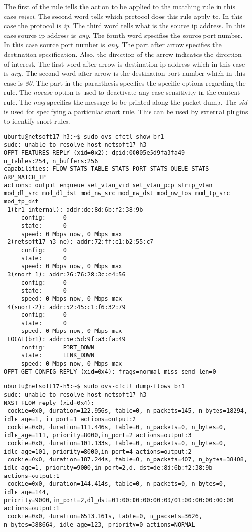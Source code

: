 \documentclass[12pt]{article}
\begin{document}
The first of the rule tells the action to be applied to the matching rule in 
this case \textit{reject}. The second word tells which protocol does this 
rule apply to. In this case the protocol is \textit{ip}. The third word 
tells what is the source ip address. In this case source ip address 
is \textit{any}. The fourth word specifies the source port number. 
In this case source port number is \textit{any}. The part after arrow specifies 
the destination specification. Also, the direction of the arrow indicates the 
direction of interest. The first word after arrow is destination ip address 
which in this case is \textit{any}. The second word
after arrow is the destination port number which in this case is \textit{80}.
The part in the paranthesis specifies the specific options regarding the rule. 
The \textit{nocase} option is used to deactivate any case sensitivity in the 
content rule. The \textit{msg} specifies the message to be printed along the 
packet dump. The \textit{sid} is used for specifying a particular snort rule.
This can be used by external plugins to identify snort rules.


\begin{verbatim}
ubuntu@netsoft17-h3:~$ sudo ovs-ofctl show br1
sudo: unable to resolve host netsoft17-h3
OFPT_FEATURES_REPLY (xid=0x2): dpid:00005e5d9fa3fa49
n_tables:254, n_buffers:256
capabilities: FLOW_STATS TABLE_STATS PORT_STATS QUEUE_STATS ARP_MATCH_IP
actions: output enqueue set_vlan_vid set_vlan_pcp strip_vlan mod_dl_src mod_dl_dst mod_nw_src mod_nw_dst mod_nw_tos mod_tp_src mod_tp_dst
 1(br1-internal): addr:de:8d:6b:f2:38:9b
     config:     0
     state:      0
     speed: 0 Mbps now, 0 Mbps max
 2(netsoft17-h3-ne): addr:72:ff:e1:b2:55:c7
     config:     0
     state:      0
     speed: 0 Mbps now, 0 Mbps max
 3(snort-1): addr:26:76:28:3c:e4:56
     config:     0
     state:      0
     speed: 0 Mbps now, 0 Mbps max
 4(snort-2): addr:52:45:c1:f6:32:79
     config:     0
     state:      0
     speed: 0 Mbps now, 0 Mbps max
 LOCAL(br1): addr:5e:5d:9f:a3:fa:49
     config:     PORT_DOWN
     state:      LINK_DOWN
     speed: 0 Mbps now, 0 Mbps max
OFPT_GET_CONFIG_REPLY (xid=0x4): frags=normal miss_send_len=0

\end{verbatim}

\begin{verbatim}
ubuntu@netsoft17-h3:~$ sudo ovs-ofctl dump-flows br1
sudo: unable to resolve host netsoft17-h3
NXST_FLOW reply (xid=0x4):
 cookie=0x0, duration=122.956s, table=0, n_packets=145, n_bytes=18294, idle_age=1, in_port=1 actions=output:2
 cookie=0x0, duration=111.446s, table=0, n_packets=0, n_bytes=0, idle_age=111, priority=8000,in_port=2 actions=output:3
 cookie=0x0, duration=101.133s, table=0, n_packets=0, n_bytes=0, idle_age=101, priority=8000,in_port=4 actions=output:2
 cookie=0x0, duration=187.244s, table=0, n_packets=407, n_bytes=38408, idle_age=1, priority=9000,in_port=2,dl_dst=de:8d:6b:f2:38:9b actions=output:1
 cookie=0x0, duration=144.414s, table=0, n_packets=0, n_bytes=0, idle_age=144, priority=9000,in_port=2,dl_dst=01:00:00:00:00:00/01:00:00:00:00:00 actions=output:1
 cookie=0x0, duration=6513.161s, table=0, n_packets=3626, n_bytes=388664, idle_age=123, priority=0 actions=NORMAL
\end{verbatim}
\end{document}
